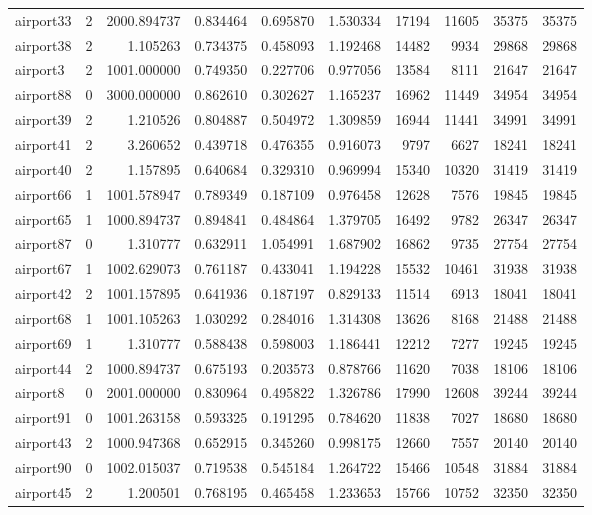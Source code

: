\begin{longtable}{|l|r|r|r|r|r|r|r|r|r|}
airport33 & 2 & 2000.894737 & 0.834464 & 0.695870 & 1.530334 & 17194 & 11605 & 35375 & 35375 \\
airport38 & 2 & 1.105263 & 0.734375 & 0.458093 & 1.192468 & 14482 & 9934 & 29868 & 29868 \\
airport3 & 2 & 1001.000000 & 0.749350 & 0.227706 & 0.977056 & 13584 & 8111 & 21647 & 21647 \\
airport88 & 0 & 3000.000000 & 0.862610 & 0.302627 & 1.165237 & 16962 & 11449 & 34954 & 34954 \\
airport39 & 2 & 1.210526 & 0.804887 & 0.504972 & 1.309859 & 16944 & 11441 & 34991 & 34991 \\
airport41 & 2 & 3.260652 & 0.439718 & 0.476355 & 0.916073 & 9797 & 6627 & 18241 & 18241 \\
airport40 & 2 & 1.157895 & 0.640684 & 0.329310 & 0.969994 & 15340 & 10320 & 31419 & 31419 \\
airport66 & 1 & 1001.578947 & 0.789349 & 0.187109 & 0.976458 & 12628 & 7576 & 19845 & 19845 \\
airport65 & 1 & 1000.894737 & 0.894841 & 0.484864 & 1.379705 & 16492 & 9782 & 26347 & 26347 \\
airport87 & 0 & 1.310777 & 0.632911 & 1.054991 & 1.687902 & 16862 & 9735 & 27754 & 27754 \\
airport67 & 1 & 1002.629073 & 0.761187 & 0.433041 & 1.194228 & 15532 & 10461 & 31938 & 31938 \\
airport42 & 2 & 1001.157895 & 0.641936 & 0.187197 & 0.829133 & 11514 & 6913 & 18041 & 18041 \\
airport68 & 1 & 1001.105263 & 1.030292 & 0.284016 & 1.314308 & 13626 & 8168 & 21488 & 21488 \\
airport69 & 1 & 1.310777 & 0.588438 & 0.598003 & 1.186441 & 12212 & 7277 & 19245 & 19245 \\
airport44 & 2 & 1000.894737 & 0.675193 & 0.203573 & 0.878766 & 11620 & 7038 & 18106 & 18106 \\
airport8 & 0 & 2001.000000 & 0.830964 & 0.495822 & 1.326786 & 17990 & 12608 & 39244 & 39244 \\
airport91 & 0 & 1001.263158 & 0.593325 & 0.191295 & 0.784620 & 11838 & 7027 & 18680 & 18680 \\
airport43 & 2 & 1000.947368 & 0.652915 & 0.345260 & 0.998175 & 12660 & 7557 & 20140 & 20140 \\
airport90 & 0 & 1002.015037 & 0.719538 & 0.545184 & 1.264722 & 15466 & 10548 & 31884 & 31884 \\
airport45 & 2 & 1.200501 & 0.768195 & 0.465458 & 1.233653 & 15766 & 10752 & 32350 & 32350 \\

\end{longtable}
